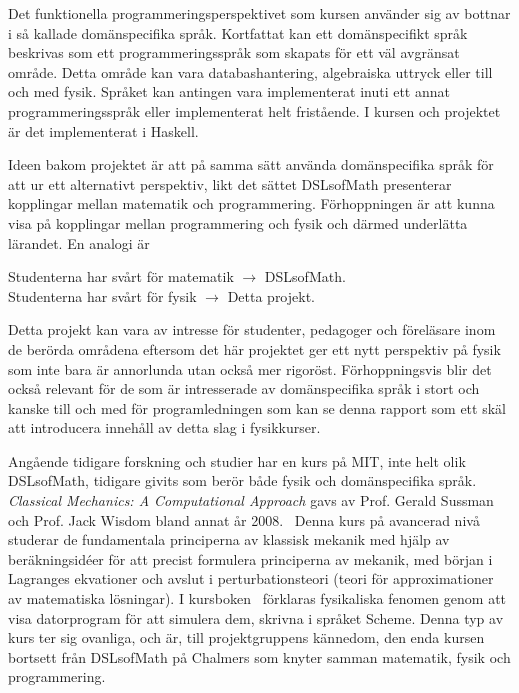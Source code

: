 \begin{draft}
Det funktionella programmeringsperspektivet som kursen använder sig av bottnar i
så kallade domänspecifika språk. Kortfattat kan ett domänspecifikt språk
beskrivas som ett programmeringsspråk som skapats för ett väl avgränsat
område. Detta område kan vara databashantering, algebraiska uttryck eller till
och med fysik. Språket kan antingen vara implementerat inuti ett annat
programmeringsspråk eller implementerat helt fristående. I kursen och projektet 
är det implementerat i Haskell.

Ideen bakom projektet är att på samma sätt använda domänspecifika språk för att ur ett alternativt perspektiv, likt det sättet DSLsofMath
presenterar kopplingar mellan matematik och programmering. Förhoppningen är att kunna visa på kopplingar mellan programmering och fysik och därmed
underlätta lärandet. En analogi är


\begin{center}
Studenterna har svårt för matematik $\rightarrow $ DSLsofMath.\\ 
Studenterna har svårt för fysik $\rightarrow $ Detta projekt.
\end{center}

Detta projekt kan vara av intresse för studenter, pedagoger och
föreläsare inom de berörda områdena eftersom det här projektet ger ett nytt
perspektiv på fysik som inte bara är annorlunda utan också mer rigoröst.
Förhoppningsvis blir det också relevant för de som är intresserade av
domänspecifika språk i stort och kanske till och med för programledningen som
kan se denna rapport som ett skäl att introducera innehåll av detta slag i
fysikkurser.

Angående tidigare forskning och studier har en kurs på MIT, inte helt olik
DSLsofMath, tidigare givits som berör både fysik och 
domänspecifika språk.
\textit{Classical Mechanics: A Computational Approach} gavs av Prof. Gerald Sussman
och Prof. Jack Wisdom bland annat år 2008.~\cite{classical-mechanics-course-mit-2008}
Denna kurs på avancerad nivå studerar de fundamentala principerna av klassisk
mekanik med hjälp av beräkningsidéer för att precist formulera principerna av
mekanik, med början i Lagranges ekvationer och avslut i perturbationsteori
(teori för approximationer av matematiska lösningar). I kursboken~\cite{SICM}
förklaras fysikaliska fenomen genom att visa datorprogram för att simulera dem,
skrivna i språket Scheme.  Denna typ av kurs ter sig ovanliga, och är, till
projektgruppens kännedom, den enda kursen bortsett från DSLsofMath på Chalmers som knyter
samman matematik, fysik och programmering.


\end{draft}
